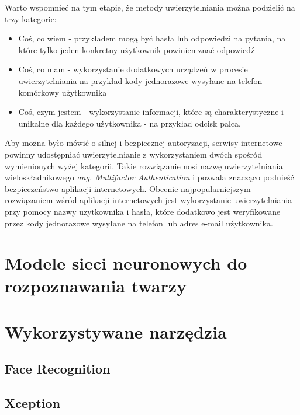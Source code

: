 Warto wspomnieć na tym etapie, że metody uwierzytelniania można podzielić na trzy kategorie:
\begin{itemize}
  \item Coś, co wiem - przykładem mogą być hasła lub odpowiedzi na pytania, na które tylko jeden konkretny użytkownik powinien znać odpowiedź
  \item Coś, co mam - wykorzystanie dodatkowych urządzeń w procesie uwierzytelniania na przykład kody jednorazowe wysyłane na telefon komórkowy użytkownika
  \item Coś, czym jestem - wykorzystanie informacji, które są charakterystyczne i unikalne dla każdego użytkownika - na przykład odcisk palca.
\end{itemize}

Aby można było mówić o silnej i bezpiecznej autoryzacji, serwisy internetowe powinny udostępniać uwierzytelnianie z wykorzystaniem dwóch spośród wymienionych wyżej kategorii. Takie rozwiązanie nosi nazwę uwierzytelniania wieloskładnikowego \emph{ang. Multifactor Authentication} i pozwala znacząco podnieść bezpieczeństwo aplikacji internetowych. Obecnie najpopularniejszym rozwiązaniem wśród aplikacji internetowych jest wykorzystanie uwierzytelniania przy pomocy nazwy uzytkownika i hasła, które dodatkowo jest weryfikowane przez kody jednorazowe wysyłane na telefon lub adres e-mail użytkownika.




\section{Modele sieci neuronowych do rozpoznawania twarzy}
\section{Wykorzystywane narzędzia}
\subsection{Face Recognition}
\subsection{Xception}


